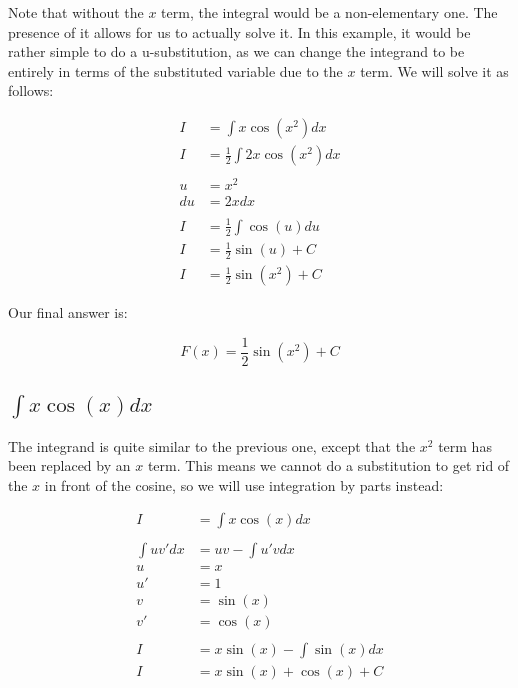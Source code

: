 \documentclass[12pt]{article}
\begin{document}
Note that without the $x$ term, the integral would be a non-elementary one.
The presence of it allows for us to actually solve it.
In this example, it would be rather simple to do a u-substitution, as we can change the integrand to be entirely in terms of the substituted variable due to the $x$ term.
We will solve it as follows:


\begin{align}
    I  & = \int x\cos(x^2) dx              \\
    I  & = \frac{1}{2} \int 2x\cos(x^2) dx \\
    \nonumber                              \\
    u  & = x^2                             \\
    du & = 2x dx                           \\
    \nonumber                              \\
    I  & = \frac{1}{2} \int \cos(u) du     \\
    I  & = \frac{1}{2} \sin(u) + C         \\
    I  & = \frac{1}{2} \sin(x^2) + C
\end{align}


Our final answer is:

$$
    F(x) = \frac{1}{2} \sin(x^2) + C
$$

\subsection{$\int x\cos(x) dx$}

The integrand is quite similar to the previous one, except that the $x^2$ term has been replaced by an $x$ term.
This means we cannot do a substitution to get rid of the $x$ in front of the cosine, so we will use integration by parts instead:


\begin{align}
    I           & = \int x\cos(x) dx           \\
    \nonumber                                  \\
    \int uv' dx & = uv - \int u'v dx           \\
    u           & = x                          \\
    u'          & = 1                          \\
    v           & = \sin(x)                    \\
    v'          & = \cos(x)                    \\
    \nonumber                                  \\
    I           & = x\sin(x) - \int \sin(x) dx \\
    I           & = x\sin(x) + \cos(x) + C
\end{align}
\end{document}
